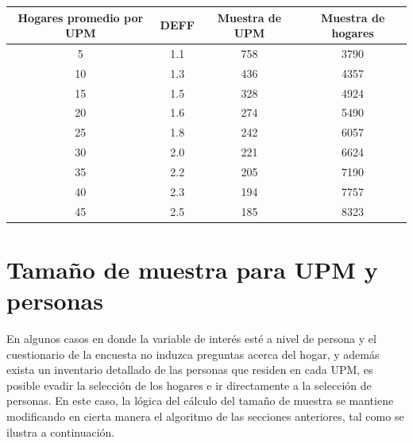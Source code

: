 \documentclass[
  12pt,
  spanish,
]{book}
\begin{document}
\begin{longtable}[]{@{}cccc@{}}
\toprule
Hogares promedio por UPM & DEFF & Muestra de UPM & Muestra de hogares \\
\midrule
\endhead
5 & 1.1 & 758 & 3790 \\
10 & 1.3 & 436 & 4357 \\
15 & 1.5 & 328 & 4924 \\
20 & 1.6 & 274 & 5490 \\
25 & 1.8 & 242 & 6057 \\
30 & 2.0 & 221 & 6624 \\
35 & 2.2 & 205 & 7190 \\
40 & 2.3 & 194 & 7757 \\
45 & 2.5 & 185 & 8323 \\
\bottomrule
\end{longtable}

\hypertarget{tamauxf1o-de-muestra-para-upm-y-personas}{%
\section{Tamaño de muestra para UPM y personas}\label{tamauxf1o-de-muestra-para-upm-y-personas}}

En algunos casos en donde la variable de interés esté a nivel de persona y el cuestionario de la encuesta no induzca preguntas acerca del hogar, y además exista un inventario detallado de las personas que residen en cada UPM, es posible evadir la selección de los hogares e ir directamente a la selección de personas. En este caso, la lógica del cálculo del tamaño de muestra se mantiene modificando en cierta manera el algoritmo de las secciones anteriores, tal como se ilustra a continuación.
\end{document}
